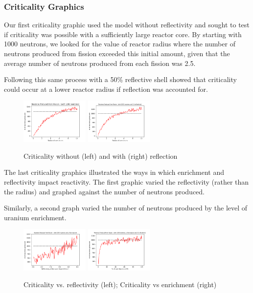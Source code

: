 \documentclass{notes}
\begin{document}
\subsubsection*{Criticality Graphics}

Our first criticality graphic used the model without reflectivity and sought to test if criticality was possible with a sufficiently large reactor core. By starting with 1000 neutrons, we looked for the value of reactor radius where the number of neutrons produced from fission exceeded this initial amount, given that the average number of neutrons produced from each fission was 2.5.

Following this same process with a 50\% reflective shell showed that criticality could occur at a lower reactor radius if reflection was accounted for.

\begin{figure}[H]
    \centering
    \includegraphics[width = 0.3\textwidth]{criticality_radius_nr.png}
    \includegraphics[width = 0.3\textwidth]{criticality_radius_r.png}
    \caption{Criticality without (left) and with (right) reflection}
\end{figure}

The last criticality graphics illustrated the ways in which enrichment and reflectivity impact reactivity. The first graphic varied the reflectivity (rather than the radius) and graphed against the number of neutrons produced.

Similarly, a second graph varied the number of neutrons produced by the level of uranium enrichment.

\begin{figure}[H]
    \centering
    \includegraphics[width = 0.3\textwidth]{criticality_reflectivity_r.png}
    \includegraphics[width = 0.3\textwidth]{criticality_enrichment_r.png}
    \caption{Criticality vs. reflectivity (left); Criticality vs enrichment (right)}
\end{figure}
\end{document}
